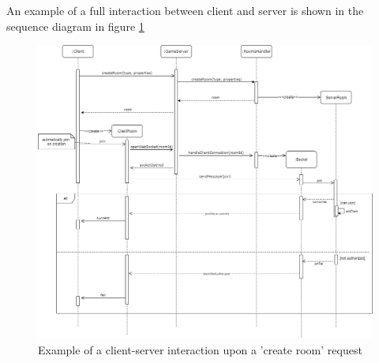 An example of a full interaction between client and server is shown in the sequence diagram in figure \ref{fig:create_room_seq}
\begin{figure}
	\hspace*{-1in}
	\includegraphics[scale=0.5]{images/4-design/crate_room_seq.png}
	\caption{Example of a client-server interaction upon a 'create room' request}
	\label{fig:create_room_seq}
\end{figure}